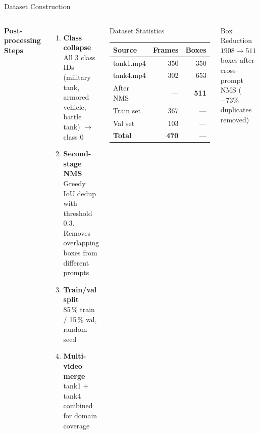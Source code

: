 \documentclass[aspectratio=169]{beamer}
\begin{document}
\begin{frame}{Dataset Construction}
\begin{columns}[T]
\textbf{Post-processing Steps}

\begin{enumerate}
  \item \textbf{Class collapse} \\
        \small All 3 class IDs (military tank, armored vehicle,
        battle tank) $\rightarrow$ class 0
  \vspace{0.2cm}
  \item \textbf{Second-stage NMS} \\
        \small Greedy IoU dedup with threshold 0.3.\\
        Removes overlapping boxes from different prompts
  \vspace{0.2cm}
  \item \textbf{Train/val split} \\
        \small 85\,\% train / 15\,\% val, random seed
  \vspace{0.2cm}
  \item \textbf{Multi-video merge} \\
        \small tank1 + tank4 combined for domain coverage
\end{enumerate}

\begin{block}{Dataset Statistics}
\small
\begin{tabular}{lrr}
\toprule
Source     & Frames & Boxes \\
\midrule
tank1.mp4  & 350    & 350   \\
tank4.mp4  & 302    & 653   \\
\midrule
After NMS  & —      & \textbf{511}  \\
\midrule
Train set  & 367    & —     \\
Val set    & 103    & —     \\
\textbf{Total} & \textbf{470} & — \\
\bottomrule
\end{tabular}
\end{block}

\begin{exampleblock}{Box Reduction}
\small $1908 \rightarrow 511$ boxes after cross-prompt NMS
($-73\%$ duplicates removed)
\end{exampleblock}
\end{columns}
\end{frame}
\end{document}
